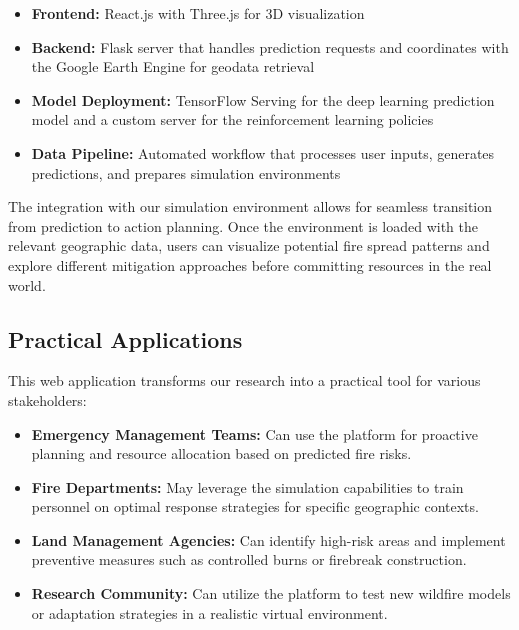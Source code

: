 \documentclass[conference]{IEEEtran}
\begin{document}
\begin{itemize}
    \item \textbf{Frontend:} React.js with Three.js for 3D visualization
    
    \item \textbf{Backend:} Flask server that handles prediction requests and coordinates with the Google Earth Engine for geodata retrieval
    
    \item \textbf{Model Deployment:} TensorFlow Serving for the deep learning prediction model and a custom server for the reinforcement learning policies
    
    \item \textbf{Data Pipeline:} Automated workflow that processes user inputs, generates predictions, and prepares simulation environments
\end{itemize}

\noindent
The integration with our simulation environment allows for seamless transition from prediction to action planning. Once the environment is loaded with the relevant geographic data, users can visualize potential fire spread patterns and explore different mitigation approaches before committing resources in the real world.

\subsection{Practical Applications}
This web application transforms our research into a practical tool for various stakeholders:

\begin{itemize}
    \item \textbf{Emergency Management Teams:} Can use the platform for proactive planning and resource allocation based on predicted fire risks.
    
    \item \textbf{Fire Departments:} May leverage the simulation capabilities to train personnel on optimal response strategies for specific geographic contexts.
    
    \item \textbf{Land Management Agencies:} Can identify high-risk areas and implement preventive measures such as controlled burns or firebreak construction.
    
    \item \textbf{Research Community:} Can utilize the platform to test new wildfire models or adaptation strategies in a realistic virtual environment.
\end{itemize}
\end{document}
